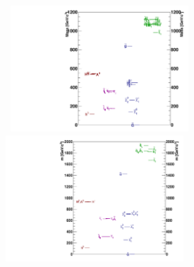 \vspace{5mm}
\begin{minipage}{0.90\linewidth}
\begin{center}
\centering
\mbox{
\includegraphics[height= 0.6\textwidth, width=0.5\textwidth]{THESISPLOTS/GMSB-Lambda100TeV-Spectrum.pdf} \quad
\includegraphics[height= 0.6\textwidth, width=0.5\textwidth]{THESISPLOTS/gmsb_Lambda180_CTau10000.pdf}  
}
\label{fig:spectra}
\end{center}
\end{minipage}


